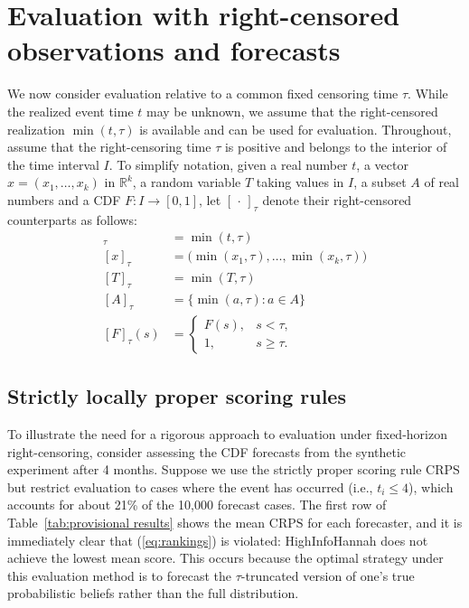 \documentclass[10pt]{article} %
\theoremstyle{theorem}
\theoremstyle{definition}
\newcommand{\RRR}{\mathbb{R}}
\newcommand{\CRPS}{\mathrm{CRPS}}
\begin{document}
\section{Evaluation with right-censored observations and forecasts}\label{s:right censored evaluation}

We now consider evaluation relative to a common fixed censoring time $\tau$. While the realized event time $t$ may be unknown, we assume that the right-censored realization $\min(t,\tau)$ is available and can be used for evaluation. Throughout, assume that the right-censoring time $\tau$ is positive and belongs to the interior of the time interval $I$. To simplify notation, given a real number $t$, a vector $x=(x_1,\ldots,x_k)$ in $\RRR^k$, a random variable $T$ taking values in $I$, a subset $A$ of real numbers and a CDF $F:I\to[0,1]$, let $[\,\cdot\,]_\tau$ denote their right-censored counterparts as follows:
\begin{align*}
[t]_\tau &= \min(t,\tau) \\
[x]_\tau &= \big(\min(x_1,\tau),\ldots,\min(x_k,\tau)\big) \\
[T]_\tau &=  \min(T,\tau) \\
[A]_\tau &= \{\min(a,\tau): a\in A \} \\
[F]_\tau(s) &=
\begin{cases}
F(s), & s < \tau, \\
1, & s \geq \tau.
\end{cases}
\end{align*}


\subsection{Strictly locally proper scoring rules}\label{ss:provisional scoring rules}

To illustrate the need for a rigorous approach to evaluation under fixed-horizon right-censoring, consider assessing the CDF forecasts from the synthetic experiment after 4 months. Suppose we use the strictly proper scoring rule $\CRPS$ but restrict evaluation to cases where the event has occurred (i.e., $t_i \leq 4$), which accounts for about 21\% of the 10,000 forecast cases. The first row of Table~\ref{tab:provisional results} shows the mean $\CRPS$ for each forecaster, and it is immediately clear that (\ref{eq:rankings}) is violated: HighInfoHannah does not achieve the lowest mean score. This occurs because the optimal strategy under this evaluation method is to forecast the $\tau$-truncated version of one’s true probabilistic beliefs rather than the full distribution.
\end{document}

